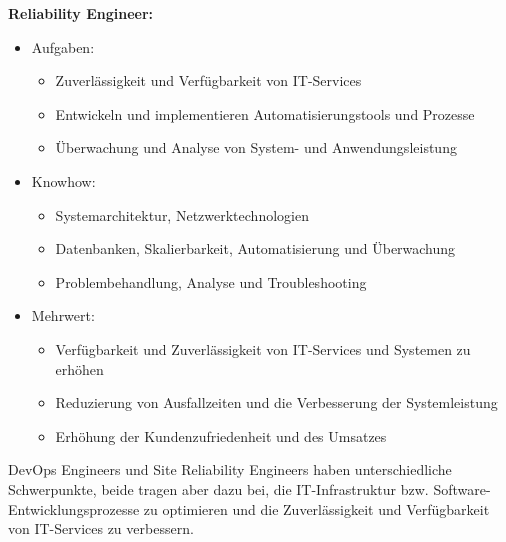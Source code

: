 \newpage
\textbf{Reliability Engineer:}
\begin{itemize}
    \item Aufgaben:
          \begin{itemize}
              \item Zuverlässigkeit und Verfügbarkeit von IT-Services
              \item Entwickeln und implementieren Automatisierungstools und Prozesse
              \item Überwachung und Analyse von System- und Anwendungsleistung
          \end{itemize}
    \item Knowhow:
          \begin{itemize}
              \item Systemarchitektur, Netzwerktechnologien
              \item Datenbanken, Skalierbarkeit, Automatisierung und Überwachung
              \item Problembehandlung, Analyse und Troubleshooting
          \end{itemize}
    \item Mehrwert:
          \begin{itemize}
              \item Verfügbarkeit und Zuverlässigkeit von IT-Services und Systemen zu erhöhen
              \item  Reduzierung von Ausfallzeiten und die Verbesserung der Systemleistung
              \item Erhöhung der Kundenzufriedenheit und des Umsatzes
          \end{itemize}
\end{itemize}

DevOps Engineers und Site Reliability Engineers haben unterschiedliche
Schwerpunkte, beide tragen aber dazu bei, die IT-Infrastruktur
bzw. Software-Entwicklungsprozesse zu optimieren und die
Zuverlässigkeit und Verfügbarkeit von IT-Services zu verbessern.